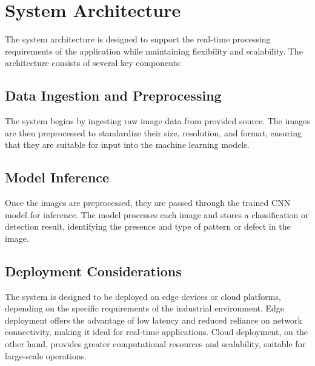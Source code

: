 \section{System Architecture}

The system architecture is designed to support the real-time processing requirements of the application while maintaining flexibility and scalability. The architecture consists of several key components:


\subsection{Data Ingestion and Preprocessing}
The system begins by ingesting raw image data from provided source. The images are then preprocessed to standardize their size, resolution, and format, ensuring that they are suitable for input into the machine learning models.


\subsection{Model Inference}
Once the images are preprocessed, they are passed through the trained CNN model for inference. The model processes each image and stores a classification or detection result, identifying the presence and type of pattern or defect in the image.

\subsection{Deployment Considerations}
The system is designed to be deployed on edge devices or cloud platforms, depending on the specific requirements of the industrial environment. Edge deployment offers the advantage of low latency and reduced reliance on network connectivity, making it ideal for real-time applications. Cloud deployment, on the other hand, provides greater computational resources and scalability, suitable for large-scale operations.

